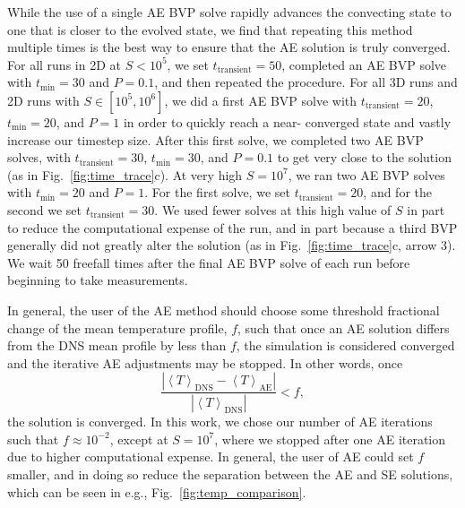 \documentclass[aps, pre, onecolumn, nofootinbib, notitlepage, groupedaddress, amsfonts, amssymb, amsmath, longbibliography]{revtex4-1}
\newcommand{\angles}[1]{\ensuremath{\left\langle #1 \right\rangle}}
\begin{document}
While the use of a single AE BVP solve rapidly advances the convecting state to
one that is closer to the evolved state, we find that repeating this method 
multiple times is the best way to
ensure that the AE solution is truly converged. For all runs in 2D at $S < 10^5$, we
set $t_{\text{transient}} = 50$, completed an AE BVP solve
with $t_{\text{min}} = 30$ and $P = 0.1$, and then repeated the procedure.
For all 3D runs and 2D runs with $S \in [10^5, 10^6]$,
we did a first AE BVP solve with $t_{\text{transient}} = 20$,
$t_{\text{min}} = 20$, and $P = 1$ in order to quickly reach a near-
converged state and vastly increase our timestep size.  After this first solve, 
we completed two AE BVP solves, with $t_{\text{transient}} = 30$,
$t_{\text{min}} = 30$, 
and $P = 0.1$ to get very close to the solution (as in Fig.~\ref{fig:time_trace}c).
At very high $S = 10^7$, we ran two AE BVP solves with $t_{\text{min}} = 20$ and
$P = 1$. For the first solve, we set $t_{\text{transient}} = 20$, and for the
second we set $t_{\text{transient}} = 30$. We used fewer solves at this high
value of $S$ in part to reduce the computational expense of the run, and in
part because a third BVP generally did not greatly alter the solution
(as in Fig.~\ref{fig:time_trace}c, arrow 3). We wait 50 freefall times after
the final AE BVP solve of each run before beginning to take measurements.

In general, the user of the AE method should choose some threshold
fractional change of the mean temperature profile, $f$, such that once
an AE solution differs from the DNS mean profile by less than $f$, the simulation
is considered converged and the iterative AE adjustments may be stopped. In
other words, once
\begin{equation}
\frac{|\angles{T}_{\text{DNS}} - \angles{T}_{\text{AE}}|}{|\angles{T}_{\text{DNS}}|} < f,
\end{equation}
the solution is converged. In this work, we chose our number of AE iterations
such that $f \approx 10^{-2}$, except at $S = 10^7$, where we stopped after one AE
iteration due to higher computational expense. In general, the user of AE could
set $f$ smaller, and in doing so reduce the separation between the AE and SE
solutions, which can be seen in e.g., Fig.~\ref{fig:temp_comparison}.






\end{document}
